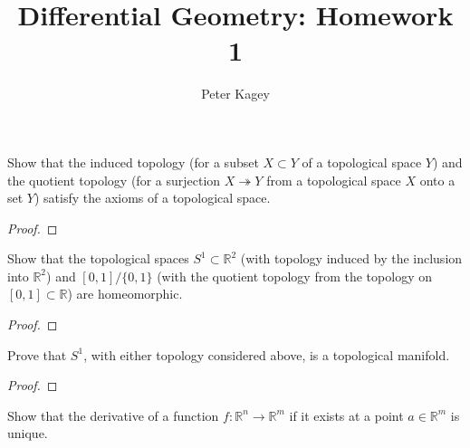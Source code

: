 \documentclass{article}
\newenvironment{problem}[2][Problem]{\begin{trivlist}
\item[\hskip \labelsep {\bfseries #1}\hskip \labelsep {\bfseries #2.}]}{\end{trivlist}}
\begin{document}
\title{Differential Geometry: Homework 1}
\author{Peter Kagey}

\maketitle

\begin{problem}{1}
  Show that the induced topology
  (for a subset $X \subset Y$ of a topological space $Y$)
  and the quotient topology (for a surjection $X \twoheadrightarrow Y$ from a
  topological space $X$ onto a set $Y$)
  satisfy the axioms of a topological space.
\end{problem}

\begin{proof}
\end{proof}

\pagebreak

\begin{problem}{2}
  Show that the topological spaces $S^1 \subset \mathbb{R}^2$
  (with topology induced by the inclusion into $\mathbb{R}^2$)
  and $[0, 1]/\{0, 1\}$
  (with the quotient topology from the topology on $[0, 1] \subset \mathbb{R}$)
  are homeomorphic.
\end{problem}

\begin{proof}
\end{proof}

\pagebreak

\begin{problem}{3}
  Prove that $S^1$, with either topology considered above, is a topological
  manifold.
\end{problem}

\begin{proof}
\end{proof}

\pagebreak

\begin{problem}{4}
  Show that the derivative of a function
  $f: \mathbb{R}^n \rightarrow \mathbb{R}^m$
  if it exists at a point $a \in \mathbb{R}^m$ is unique.
\end{problem}
\end{document}
